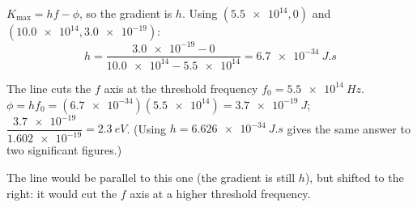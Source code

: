 \documentclass[12pt]{article}
\begin{document}
\ansq
{}
\begin{crit}
\end{crit}
\sample
$K_\mathrm{max} = hf - \phi$, so the gradient is $h$. Using $(\num{5.5e14}, 0)$ and
$(\num{10.0e14}, \num{3.0e-19})$:
\[ h = \frac{\num{3.0e-19} - 0}{\num{10.0e14} - \num{5.5e14}} = \qty{6.7e-34}{J.s} \]
\begin{crit}
\end{crit}
\sample
The line cuts the $f$ axis at the threshold frequency $f_0 = \qty{5.5e14}{Hz}$.
$\phi = hf_0 = (\num{6.7e-34})(\num{5.5e14}) = \qty{3.7e-19}{J}$;
$\dfrac{\num{3.7e-19}}{\num{1.602e-19}} = \qty{2.3}{eV}$.
(Using $h = \qty{6.626e-34}{J.s}$ gives the same answer to two significant figures.)
\begin{crit}
\end{crit}
\sample
The line would be parallel to this one (the gradient is still $h$), but shifted to the right: it would cut
the $f$ axis at a higher threshold frequency.
\end{document}
